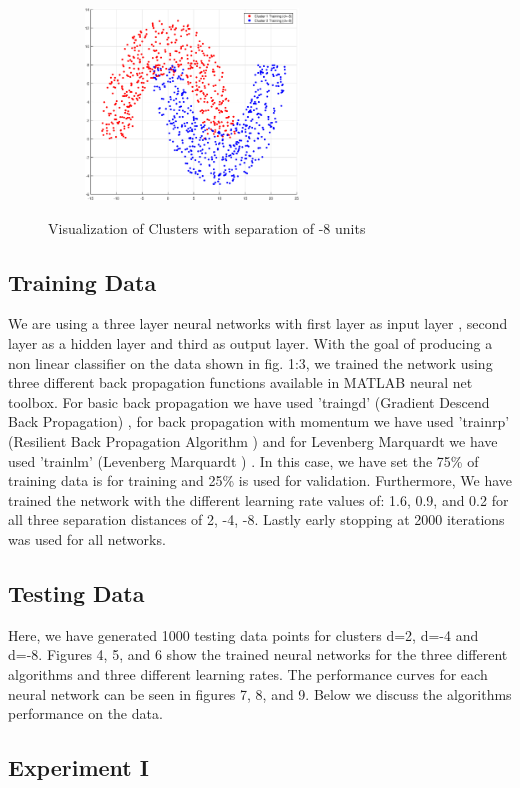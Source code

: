 \documentclass[conference]{IEEEtran}
\begin{document}
\begin{figure}
\centering
{\includegraphics[width=3in,height=2in,clip,keepaspectratio]{ClustersDn8.eps} }\\
\caption{ Visualization of Clusters with separation of -8 units}
\end{figure}
\subsection{Training Data}
We are using a three layer neural networks with first layer as input layer , second layer as a hidden layer and third as output layer. With the goal of producing a non linear classifier on the data shown in fig. 1:3, we trained the network using three different back propagation functions available in MATLAB neural net toolbox. For basic back propagation we have used 'traingd' (Gradient Descend Back Propagation)\cite{gd} \cite{mgd}, for back propagation with momentum we have used 'trainrp' (Resilient Back Propagation Algorithm )\cite{gdm} \cite{mgdm}and for Levenberg Marquardt we have used 'trainlm' (Levenberg Marquardt )\cite{lm} \cite{mlm}. In this case, we have set the 75\% of training data is for training and 25\% is used for validation. Furthermore, We have trained the network with the different learning rate values of: 1.6, 0.9, and 0.2  for all three separation distances of 2, -4, -8. Lastly early stopping at 2000 iterations was used for all networks.

\subsection{Testing Data}
 Here, we have generated 1000 testing data points for clusters d=2, d=-4 and d=-8. Figures 4, 5, and 6 show the trained neural networks for the three different algorithms and three different learning rates. The performance curves for each neural network can be seen in figures 7, 8, and 9. Below we discuss the algorithms performance on the data.
\subsection{Experiment I}
\end{document}
